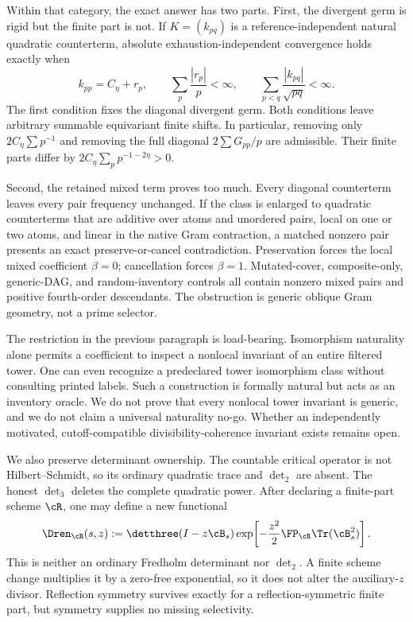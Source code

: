 Within that category, the exact answer has two parts.  First, the divergent
germ is rigid but the finite part is not.  If $K=(k_{pq})$ is a
reference-independent natural quadratic counterterm, absolute
exhaustion-independent convergence holds exactly when
\begin{equation}
 k_{pp}=C_\eta+r_p,
 \qquad \sum_p\frac{|r_p|}{p}<\infty,
 \qquad
 \sum_{p<q}\frac{|k_{pq}|}{\sqrt{pq}}<\infty.
 \label{eq:intro-classification}
\end{equation}
The first condition fixes the diagonal divergent germ.  Both conditions
leave arbitrary summable equivariant finite shifts.  In particular, removing
only $2C_\eta\sum p^{-1}$ and removing the full diagonal
$2\sum G_{pp}/p$ are admissible.  Their finite parts differ by
$2C_\eta\sum_pp^{-1-2\eta}>0$.

Second, the retained mixed term proves too much.  Every diagonal counterterm
leaves every pair frequency unchanged.  If the class is enlarged to
quadratic counterterms that are additive over atoms and unordered pairs,
local on one or two atoms, and linear in the native Gram contraction, a
matched nonzero pair presents an exact preserve-or-cancel contradiction.
Preservation forces the local mixed coefficient $\beta=0$; cancellation
forces $\beta=1$.  Mutated-cover, composite-only, generic-DAG, and
random-inventory controls all contain nonzero mixed pairs and positive
fourth-order descendants.  The obstruction is generic oblique Gram geometry,
not a prime selector.

The restriction in the previous paragraph is load-bearing.  Isomorphism
naturality alone permits a coefficient to inspect a nonlocal invariant of an
entire filtered tower.  One can even recognize a predeclared tower
isomorphism class without consulting printed labels.  Such a construction is
formally natural but acts as an inventory oracle.  We do not prove that every
nonlocal tower invariant is generic, and we do not claim a universal
naturality no-go.  Whether an independently motivated, cutoff-compatible
divisibility-coherence invariant exists remains open.

We also preserve determinant ownership.  The countable critical operator is
not Hilbert--Schmidt, so its ordinary quadratic trace and $\det_2$ are absent.
The honest $\det_3$ deletes the complete quadratic power.  After declaring a
finite-part scheme $\cR$, one may define a new functional
\begin{equation}
 \Dren_{\cR}(s,z)
 :=\detthree(I-z\cB_s)
 \exp\!\left[-\frac{z^2}{2}
  \FP_{\cR}\Tr(\cB_s^2)\right].
 \label{eq:intro-dren}
\end{equation}
This is neither an ordinary Fredholm determinant nor $\det_2$.  A finite
scheme change multiplies it by a zero-free exponential, so it does not alter
the auxiliary-$z$ divisor.  Reflection symmetry survives exactly for a
reflection-symmetric finite part, but symmetry supplies no missing
selectivity.

